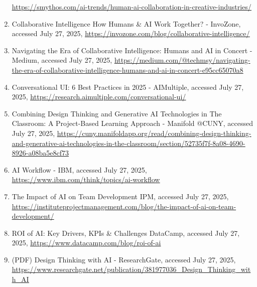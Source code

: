 \documentclass[
  12pt,
  a4paper,
  bibliography=totoc,
  numbers=noenddot
]{scrartcl}
\begin{document}
\begin{enumerate}
  \href{https://smythos.com/ai-trends/human-ai-collaboration-in-creative-industries/}{\ul{https://smythos.com/ai-trends/human-ai-collaboration-in-creative-industries/}}
\item
  Collaborative Intelligence \textbar{} How Humans \& AI Work Together?
  - InvoZone, accessed July 27, 2025,
  \href{https://invozone.com/blog/collaborative-intelligence/}{\ul{https://invozone.com/blog/collaborative-intelligence/}}
\item
  Navigating the Era of Collaborative Intelligence: Humans and AI in
  Concert - Medium, accessed July 27, 2025,
  \href{https://medium.com/@techmsy/navigating-the-era-of-collaborative-intelligence-humans-and-ai-in-concert-e95cc65070a8}{\ul{https://medium.com/@techmsy/navigating-the-era-of-collaborative-intelligence-humans-and-ai-in-concert-e95cc65070a8}}
\item
  Conversational UI: 6 Best Practices in 2025 - AIMultiple, accessed
  July 27, 2025,
  \href{https://research.aimultiple.com/conversational-ui/}{\ul{https://research.aimultiple.com/conversational-ui/}}
\item
  Combining Design Thinking and Generative AI Technologies in The
  Classroom: A Project-Based Learning Approach - Manifold @CUNY,
  accessed July 27, 2025,
  \href{https://cuny.manifoldapp.org/read/combining-design-thinking-and-generative-ai-technologies-in-the-classroom/section/52735f7f-8a08-4690-8926-a08ba5e8cf73}{\ul{https://cuny.manifoldapp.org/read/combining-design-thinking-and-generative-ai-technologies-in-the-classroom/section/52735f7f-8a08-4690-8926-a08ba5e8cf73}}
\item
  AI Workflow - IBM, accessed July 27, 2025,
  \href{https://www.ibm.com/think/topics/ai-workflow}{\ul{https://www.ibm.com/think/topics/ai-workflow}}
\item
  The Impact of AI on Team Development \textbar{} IPM, accessed July 27,
  2025,
  \href{https://instituteprojectmanagement.com/blog/the-impact-of-ai-on-team-development/}{\ul{https://instituteprojectmanagement.com/blog/the-impact-of-ai-on-team-development/}}
\item
  ROI of AI: Key Drivers, KPIs \& Challenges \textbar{} DataCamp,
  accessed July 27, 2025,
  \href{https://www.datacamp.com/blog/roi-of-ai}{\ul{https://www.datacamp.com/blog/roi-of-ai}}
\item
  (PDF) Design Thinking with AI - ResearchGate, accessed July 27, 2025,
  \href{https://www.researchgate.net/publication/381977036_Design_Thinking_with_AI}{\ul{https://www.researchgate.net/publication/381977036\_Design\_Thinking\_with\_AI}}

\end{enumerate}
\end{document}
